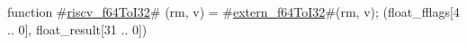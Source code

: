 function #\hyperref[sailRISCVzriscvzyf64ToI32]{riscv\_f64ToI32}# (rm, v) = {
  #\hyperref[sailRISCVzexternzyf64ToI32]{extern\_f64ToI32}#(rm, v);
  (float_fflags[4 .. 0], float_result[31 .. 0])
}
